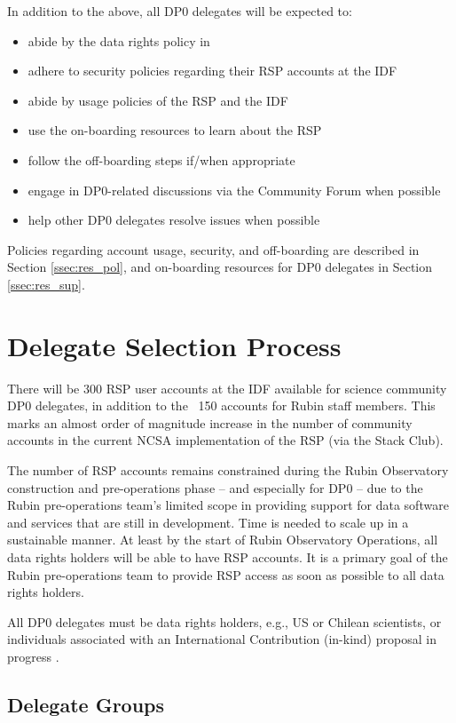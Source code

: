 \documentclass[DM,lsstdraft,authoryear,toc]{lsstdoc}
\begin{document}
In addition to the above, all DP0 delegates will be expected to:
\begin{itemize}
\item abide by the data rights policy in 
\item adhere to security policies regarding their RSP accounts at the IDF
\item abide by usage policies of the RSP and the IDF
\item use the on-boarding resources to learn about the RSP
\item follow the off-boarding steps if/when appropriate
\item engage in DP0-related discussions via the Community Forum when possible
\item help other DP0 delegates resolve issues when possible
\end{itemize}

Policies regarding account usage, security, and off-boarding are described in Section \ref{ssec:res_pol}, and on-boarding resources for DP0 delegates in Section \ref{ssec:res_sup}. 


\section{Delegate Selection Process}\label{sec:sel}

There will be 300 RSP user accounts at the IDF available for science community DP0 delegates, in addition to the ~150 accounts for Rubin staff members.
This marks an almost order of magnitude increase in the number of community accounts in the current NCSA implementation of the RSP (via the Stack Club).

The number of RSP accounts remains constrained during the Rubin Observatory construction and pre-operations phase -- and especially for DP0 -- due to the Rubin pre-operations team's limited scope in providing support for data software and services that are still in development.
Time is needed to scale up in a sustainable manner.
At least by the start of Rubin Observatory Operations, all data rights holders will be able to have RSP accounts.
It is a primary goal of the Rubin pre-operations team to provide RSP access as soon as possible to all data rights holders. 

All DP0 delegates must be data rights holders, e.g., US or Chilean scientists, or individuals associated with an International Contribution (in-kind) proposal in progress .

\subsection{Delegate Groups}\label{ssec:sel_grps}
\end{document}
